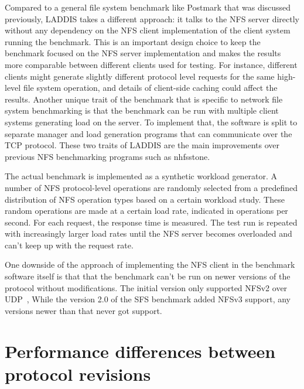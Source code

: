 Compared to a general file system benchmark like Postmark that was discussed previously,
LADDIS takes a different approach: it talks to the NFS server directly
without any dependency on the NFS client implementation of the client system running the benchmark.
This is an important design choice to keep the benchmark focused on the NFS server implementation and makes the results more comparable
between different clients used for testing.
For instance, different clients might generate slightly different protocol level requests for the same high-level file system operation,
and details of client-side caching could affect the results.
Another unique trait of the benchmark that is specific to network file system benchmarking is that the benchmark can be run with
multiple client systems generating load on the server.
To implement that, the software is split to separate manager and load generation programs that can communicate over the TCP protocol.
These two traits of LADDIS are the main improvements over previous NFS benchmarking programs such as nhfsstone.

The actual benchmark is implemented as a synthetic workload generator.
A number of NFS protocol-level operations are randomly selected from a predefined distribution of NFS operation types
based on a certain workload study.
These random operations are made at a certain load rate, indicated in operations per second.
For each request, the response time is measured.
The test run is repeated with increasingly larger load rates until the NFS server becomes overloaded and can't keep up with the request rate.

One downside of the approach of implementing the NFS client in the benchmark software itself is that
that the benchmark can't be run on newer versions of the protocol without modifications.
The initial version only supported NFSv2 over UDP~\cite{MetaStudy},
While the version 2.0 of the SFS benchmark added NFSv3 support, any versions newer than that never got support.


\section{Performance differences between protocol revisions} \label{sect:NFSv41}


